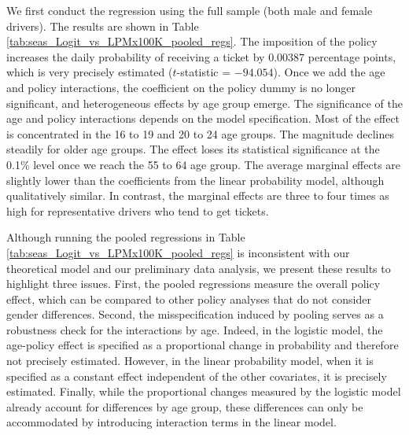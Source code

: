 We first conduct the regression using the full sample 
(both male and female drivers).
The results are shown in 
Table \ref{tab:seas_Logit_vs_LPMx100K_pooled_regs}.
% 
The imposition of the policy increases the daily probability 
of receiving a ticket by $0.00387$ percentage points, 
which is very precisely estimated ($t$-statistic = $-94.054$). 
Once we add the age and policy interactions, 
the coefficient on the policy dummy is no longer significant, 
and heterogeneous effects by age group emerge. 
% 
The significance of the age and policy interactions
depends on the model specification. 
% 
Most of the effect is concentrated in the 16 to 19 and 20 to 24 age groups. The magnitude declines steadily for older age groups. 
The effect loses its statistical significance at the 0.1\% level once we reach the 55 to 64 age group.
% 
The average marginal effects are slightly lower than the coefficients 
from the linear probability model, although qualitatively similar. 
In contrast, the marginal effects are three to four times as high
for representative drivers who tend to get tickets. 

Although running the pooled regressions in 
Table \ref{tab:seas_Logit_vs_LPMx100K_pooled_regs}
is inconsistent with our theoretical model and our preliminary data analysis, 
we present these results to highlight three issues. 
% 
First, the pooled regressions measure the overall policy effect, 
which can be compared to other policy analyses that do not
consider gender differences. 
% 
Second, the misspecification induced by pooling serves as a robustness check for the interactions by age. Indeed, in the logistic model, the age-policy effect is specified as a proportional change in probability and therefore not precisely estimated. However, in the linear probability model, when it is specified as a constant effect independent of the other covariates, it is precisely estimated.
%
Finally, while the proportional changes measured by the logistic model already account for differences by age group, these differences can only be accommodated by introducing interaction terms in the linear model.

